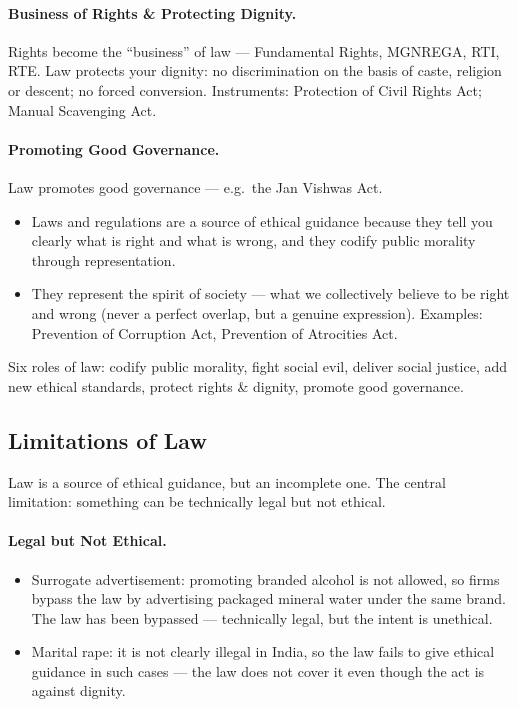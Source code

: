 \paragraph{Business of Rights \& Protecting Dignity.} Rights become the ``business'' of law --- Fundamental Rights, MGNREGA, RTI, RTE. Law protects your dignity: no discrimination on the basis of caste, religion or descent; no forced conversion. Instruments: Protection of Civil Rights Act; Manual Scavenging Act.

\paragraph{Promoting Good Governance.} Law promotes good governance --- e.g.\ the Jan Vishwas Act.

\begin{CriticalPoint}
\begin{itemize}
\item Laws and regulations are a source of ethical guidance because they tell you clearly what is right and what is wrong, and they codify public morality through representation.
\item They represent the spirit of society --- what we collectively believe to be right and wrong (never a perfect overlap, but a genuine expression). Examples: Prevention of Corruption Act, Prevention of Atrocities Act.
\end{itemize}
\end{CriticalPoint}

\begin{QuickRevision}
Six roles of law: codify public morality, fight social evil, deliver social justice, add new ethical standards, protect rights \& dignity, promote good governance.
\end{QuickRevision}

\subsection{Limitations of Law}
Law is a source of ethical guidance, but an incomplete one. The central limitation: something can be technically legal but not ethical.

\paragraph{Legal but Not Ethical.}
\begin{ExampleBox}
\begin{itemize}
\item Surrogate advertisement: promoting branded alcohol is not allowed, so firms bypass the law by advertising packaged mineral water under the same brand. The law has been bypassed --- technically legal, but the intent is unethical.
\item Marital rape: it is not clearly illegal in India, so the law fails to give ethical guidance in such cases --- the law does not cover it even though the act is against dignity.
\end{itemize}
\end{ExampleBox}

